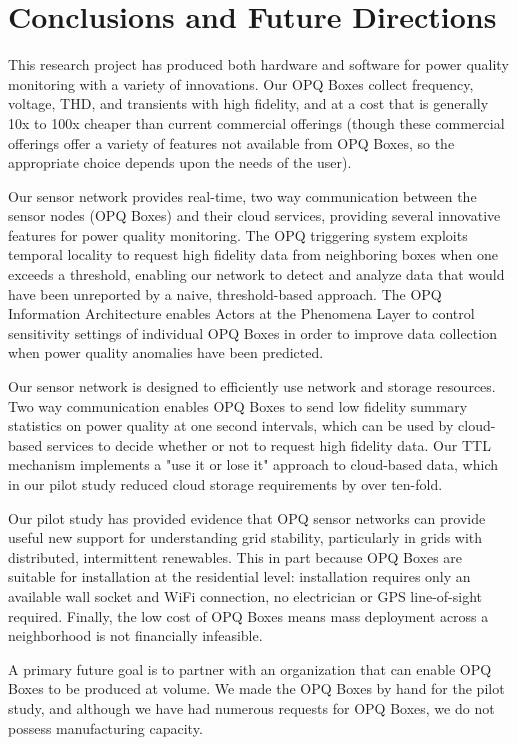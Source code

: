\section{Conclusions and Future Directions}
\label{sec:conclusions}

This research project has produced both hardware and software for power quality monitoring with a variety of innovations.  Our OPQ Boxes collect frequency, voltage, THD, and transients with high fidelity, and at a cost that is generally 10x to 100x cheaper than current commercial offerings (though these commercial offerings offer a variety of features not available from OPQ Boxes, so the appropriate choice depends upon the needs of the user).

Our sensor network provides real-time, two way communication between the sensor nodes (OPQ Boxes) and their cloud services, providing several innovative features for power quality monitoring. The OPQ triggering system exploits temporal locality to request high fidelity data from neighboring boxes when one exceeds a threshold, enabling our network to detect and analyze data that would have been unreported by a naive, threshold-based approach. The OPQ Information Architecture enables Actors at the Phenomena Layer to control sensitivity settings of individual OPQ Boxes in order to improve data collection when power quality anomalies have been predicted.

Our sensor network is designed to efficiently use network and storage resources. Two way communication enables OPQ Boxes to send low fidelity summary statistics on power quality at one second intervals, which can be used by cloud-based services to decide whether or not to request high fidelity data.  Our TTL mechanism implements a "use it or lose it" approach to cloud-based data, which in our pilot study reduced cloud storage requirements by over ten-fold.

Our pilot study has provided evidence that OPQ sensor networks can provide useful new support for understanding grid stability, particularly in grids with distributed, intermittent renewables. This in part because OPQ Boxes are suitable for installation at the residential level: installation requires only an available wall socket and WiFi connection, no electrician or GPS line-of-sight required. Finally, the low cost of OPQ Boxes means mass deployment across a neighborhood is not financially infeasible.

A primary future goal is to partner with an organization that can enable OPQ Boxes to be produced at volume. We made the OPQ Boxes by hand for the pilot study, and although we have had numerous requests for OPQ Boxes, we do not possess manufacturing capacity.

